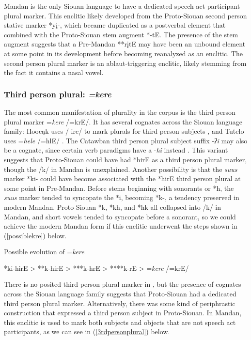 Mandan is the only Siouan language to have a dedicated speech act participant plural marker. This enclitic likely developed from the Proto-Siouan second person stative marker *yį-, which became duplicated as a postverbal element that combined with the Proto-Siouan stem augment *-tE. The presence of the stem augment suggests that a Pre-Mandan **rįtE may have been an unbound element at some point in its development before becoming reanalyzed as an enclitic. The second person plural marker is an ablaut-triggering enclitic, likely stemming from the fact it contains a nasal vowel.

\subsubsection{Third person plural: \textit{=kere}}

The most common manifestation of plurality in the corpus is the third person plural marker =\textit{kere} /=krE/. It has several cognates across the Siouan language family: Hoocąk uses /-ire/ to mark plurals for third person subjects \citep[6]{lipkind1945}, and Tutelo uses =\textit{hele} /=hlE/ \citep[41]{oliverio1997}. The Catawban third person plural subject suffix -\textit{ʔi} may also be a cognate, since certain verb paradigms have a -\textit{hi} instead \citep[42]{rudes2007a}. This variant suggests that Proto-Siouan could have had *hirE as a third person plural marker, though the /k/ in Mandan is unexplained. Another possibility is that the \textit{suus} marker *ki- could have become associated with the *hirE third person plural at some point in Pre-Mandan. Before stems beginning with sonorants or *h, the \textit{suus} marker tended to syncopate the *i, becoming *k-, a tendency preserved in modern Mandan. Proto-Siouan *k, *kh, and *hk all collapsed into /k/ in Mandan, and short vowels tended to syncopate before a sonorant, so we could achieve the modern Mandan form if this enclitic underwent the steps shown in (\ref{possiblekre}) below.

\begin{exe}

\item\label{possiblekre} Possible evolution of =\textit{kere}

*ki-hirE > **k-hirE > ***k-hrE > ****k-rE > =\textit{kere} /=krE/

\end{exe}

There is no posited third person plural marker in \citet{rankin2015}, but the presence of cognates across the Siouan language family suggests that Proto-Siouan had a dedicated third person plural marker. Alternatively, there was some kind of periphrastic construction that expressed a third person subject in Proto-Siouan. In Mandan, this enclitic is used to mark both subjects and objects that are not speech act participants, as we can see in (\ref{3rdpersonplural}) below.

